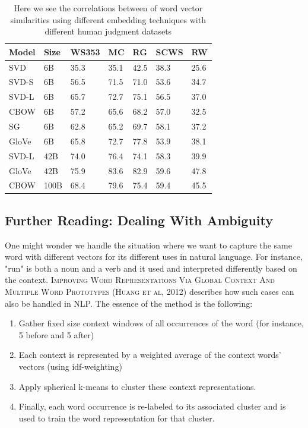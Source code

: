 \documentclass{tufte-handout}
\begin{document}
\begin{table}[ht]
  \centering
  \selectfont
  \begin{tabular}{ll | lllll}
    \toprule
    Model & Size & WS353 & MC & RG & SCWS & RW \\
    \midrule    
    SVD & 6B & 35.3 & 35.1 & 42.5 & 38.3 & 25.6\\
    SVD-S & 6B & 56.5 & 71.5 & 71.0 & 53.6 & 34.7\\
    SVD-L & 6B & 65.7 & 72.7 & 75.1 & 56.5 & 37.0\\
    CBOW & 6B & 57.2 & 65.6 & 68.2 & 57.0 & 32.5\\
    SG & 6B & 62.8 & 65.2 & 69.7 & 58.1 & 37.2\\
    GloVe & 6B & 65.8 & 72.7 & 77.8 & 53.9 & 38.1\\
    \hline
    SVD-L & 42B & 74.0 & 76.4 & 74.1 & 58.3 & 39.9\\
    GloVe & 42B & 75.9 & 83.6 & 82.9 & 59.6 & 47.8\\
    \hline
    CBOW & 100B & 68.4 & 79.6 & 75.4 & 59.4 & 45.5\\
    \bottomrule
  \end{tabular}
  \caption{Here we see the correlations between of word vector similarities using different embedding techniques with different human judgment datasets}
  \label{tab:normaltab}
\end{table}

\subsection{Further Reading: Dealing With Ambiguity}
One might wonder we handle the situation where we want to capture the same word with different vectors for its different uses in natural language. For instance, "run" is both a noun and a verb and it used and interpreted differently based on the context. \textsc{Improving Word Representations Via Global Context And Multiple Word Prototypes (Huang et al, 2012)} describes how such cases can also be handled in NLP. The essence of the method is the following:

\begin{enumerate}
\item Gather fixed size context windows of all occurrences of the word (for instance, 5 before and 5 after)
\item Each context is represented by a weighted average of the context words' vectors (using idf-weighting)
\item Apply spherical k-means to cluster these context representations.
\item Finally, each word occurrence is re-labeled to its associated cluster and is used to train the word representation for that cluster.
\end{enumerate}
\end{document}

